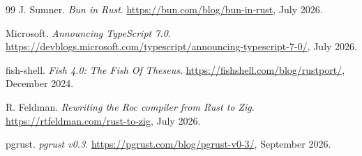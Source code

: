 \documentclass[11pt,a4paper]{article}
\begin{document}
\begin{thebibliography}{99}
 J. Sumner. \emph{Bun in Rust}. \url{https://bun.com/blog/bun-in-rust}, July 2026.

 Microsoft. \emph{Announcing TypeScript 7.0}.
\url{https://devblogs.microsoft.com/typescript/announcing-typescript-7-0/}, July 2026.

 fish-shell. \emph{Fish 4.0: The Fish Of Theseus}. \url{https://fishshell.com/blog/rustport/},
December 2024.

 R. Feldman. \emph{Rewriting the Roc compiler from Rust to Zig}.
\url{https://rtfeldman.com/rust-to-zig}, July 2026.

 pgrust. \emph{pgrust v0.3}. \url{https://pgrust.com/blog/pgrust-v0-3/}, September 2026.
\end{thebibliography}
\end{document}
